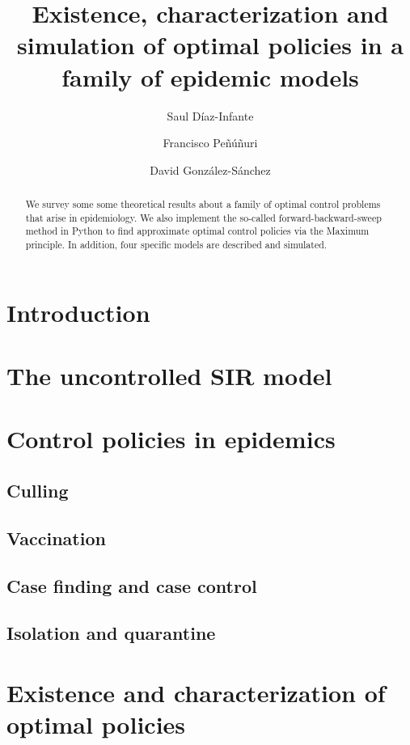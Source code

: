 \documentclass[11pt]{amsart}
\title[%
	Optimal policies in a family of epidemic models%
	]{
	Existence, characterization and simulation of optimal policies in a family of epidemic 
  models
}
\author[S. D\'iaz-Infante]{Saul D\'iaz-Infante}
\author[F. Pe\~nu\~n\'{u}ri]{Francisco Pe\~n\'u\~nuri}
\author[D. Gonz\'alez-S\'anchez]{David Gonz\'alez-S\'anchez}
\theoremstyle{definition}
\numberwithin{equation}{section}
\begin{document}
  \begin{abstract}
    We survey some some theoretical results about a family of optimal 
    control problems that arise in epidemiology. We also implement the
    so-called forward-backward-sweep method in Python to find approximate
    optimal control policies via the Maximum principle. In addition,
    four specific models are described and simulated.  
  \end{abstract}
\maketitle	
%
  \section{Introduction}
    
  \section{The uncontrolled SIR model}
    
  \section{Control policies in epidemics}
    
    \subsection{Culling}
      
    \subsection{Vaccination}
      
    \subsection{Case finding and case control}
      
    \subsection{Isolation and quarantine}
      
%
  \section{Existence and characterization of optimal policies}
    
%
\end{document}
